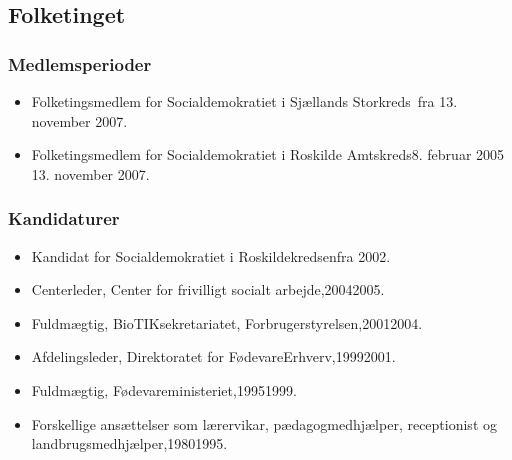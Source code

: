 \documentclass[11pt, a4paper]{awesome-cv}
\begin{document}
\begin{cvletter}
\subsection*{Folketinget}
\subsubsection*{Medlemsperioder}
\begin{itemize}
\item Folketingsmedlem for Socialdemokratiet i Sjællands Storkreds fra 13. november 2007.
\item Folketingsmedlem for Socialdemokratiet i Roskilde Amtskreds8. februar 2005  13. november 2007.
\end{itemize}
\subsubsection*{Kandidaturer}
\begin{itemize}
\item Kandidat for Socialdemokratiet i Roskildekredsenfra 2002.
\end{itemize}
\begin{itemize}
\item Centerleder, Center for frivilligt socialt arbejde,20042005.
\item Fuldmægtig, BioTIKsekretariatet, Forbrugerstyrelsen,20012004.
\item Afdelingsleder, Direktoratet for FødevareErhverv,19992001.
\item Fuldmægtig, Fødevareministeriet,19951999.
\item Forskellige ansættelser som lærervikar, pædagogmedhjælper, receptionist og landbrugsmedhjælper,19801995.
\end{itemize}
\end{cvletter}
\end{document}
